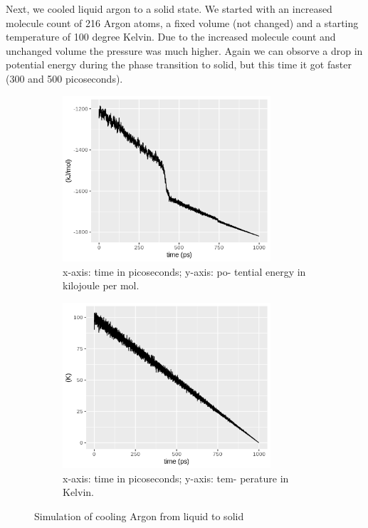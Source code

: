 \documentclass[10pt, a4paper, oneside, twocolumn]{report}
\begin{document}
Next, we cooled liquid argon to a solid state. We started with an increased molecule count of 216 Argon atoms, a fixed volume (not changed) and a starting temperature of 100 degree Kelvin. Due to the increased molecule count and unchanged volume the pressure was much higher. Again we can obsorve a drop in potential energy during the phase transition to solid, but this time it got faster (300 and 500 picoseconds).

\begin{figure}
	\begin{subfigure}[HB!]{0.5\textwidth}
	\includegraphics[width=0.85\textwidth]{plots//freezing/freezing_pot_en.png}
    \caption{x-axis: time in picoseconds; y-axis: po-
    	tential energy in kilojoule per mol.}
\end{subfigure}
	\begin{subfigure}[HB!]{0.5\textwidth}
	\includegraphics[width=0.85\textwidth]{plots//freezing/freezing_temp.png}
    \caption{x-axis: time in picoseconds; y-axis: tem-
    	perature in Kelvin.}
\end{subfigure}
\caption{Simulation of cooling Argon from liquid to solid}
\end{figure}
\end{document}

